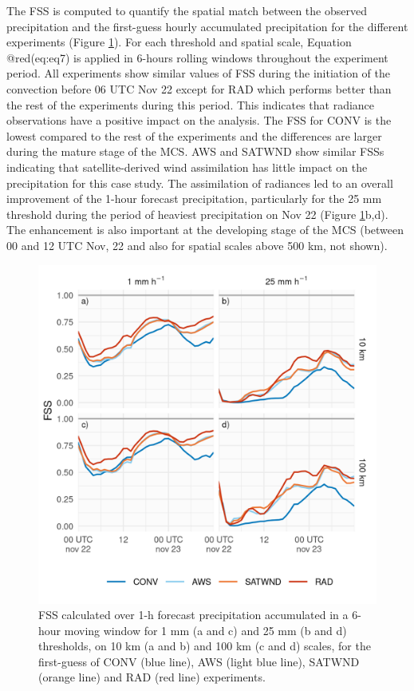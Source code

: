 \documentclass[preprint, 3p, authoryear,review, 12pt]{elsarticle} %
\begin{document}
The FSS is computed to quantify the spatial match between the observed precipitation and the first-guess hourly accumulated precipitation for the different experiments (Figure \ref{fig:fss}). For each threshold and spatial scale, Equation @red(eq:eq7) is applied in 6-hours rolling windows throughout the experiment period. All experiments show similar values of FSS during the initiation of the convection before 06 UTC Nov 22 except for RAD which performs better than the rest of the experiments during this period. This indicates that radiance observations have a positive impact on the analysis. The FSS for CONV is the lowest compared to the rest of the experiments and the differences are larger during the mature stage of the MCS. AWS and SATWND show similar FSSs indicating that satellite-derived wind assimilation has little impact on the precipitation for this case study. The assimilation of radiances led to an overall improvement of the 1-hour forecast precipitation, particularly for the 25 mm threshold during the period of heaviest precipitation on Nov 22 (Figure \ref{fig:fss}b,d). The enhancement is also important at the developing stage of the MCS (between 00 and 12 UTC Nov, 22 and also for spatial scales above 500 km, not shown).



\begin{figure}
\centering
\includegraphics{../figures/fss-1.png}
\caption{\label{fig:fss}FSS calculated over 1-h forecast precipitation accumulated in a 6-hour moving window for 1 mm (a and c) and 25 mm (b and d) thresholds, on 10 km (a and b) and 100 km (c and d) scales, for the first-guess of CONV (blue line), AWS (light blue line), SATWND (orange line) and RAD (red line) experiments.}
\end{figure}
\end{document}
